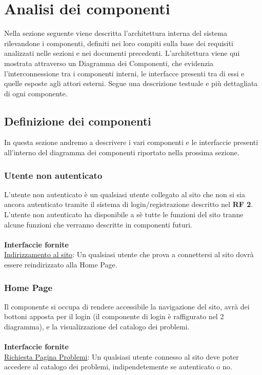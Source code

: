 \documentclass[11pt, a4paper]{article}
\theoremstyle{definition} %
\begin{document}
\newpage
\section{Analisi dei componenti}



Nella sezione seguente viene descritta l'architettura interna del sistema
rilevandone i componenti, definiti nei loro compiti sulla base dei requisiti
analizzati nelle sezioni e nei documenti precedenti. L'architettura viene
qui mostrata attraverso un Diagramma dei Componenti, che evidenzia
l'interconnessione tra i componenti interni, le interfacce presenti tra di
essi e quelle esposte agli attori esterni. Segue una descrizione testuale
e più dettagliata di ogni componente.


\subsection{Definizione dei componenti}
In questa sezione andremo a descrivere i vari componenti e le interfaccie presenti all'interno del diagramma dei componenti riportato nella prossima sezione.
\subsubsection{Utente non autenticato}
L'utente non autenticato è un qualsiasi utente collegato al sito che non si sia ancora autenticato tramite il sistema di login/registrazione descritto nel \textbf{RF 2}.\\
L'utente non autenticato ha disponibile a sè tutte le funzioni del sito tranne alcune funzioni che verranno descritte in componenti futuri.\\
\\
\textbf{Interfaccie fornite}\\
\underline{Indirizzamento al sito}: Un qualsiasi utente che prova a connettersi al sito dovrà essere reindirizzato alla Home Page.
\subsubsection{Home Page}
Il componente si occupa di rendere accessibile la navigazione del sito, avrà dei bottoni apposta per il login (il componente di login è raffigurato nel 2 diagramma), e la visualizzazione del catalogo dei problemi.
\\\\\textbf{Interfaccie fornite}\\
\underline{Richiesta Pagina Problemi}: Un qualsiasi utente connesso al sito deve poter accedere al catalogo dei problemi, indipendetemente se autenticato o no.
\end{document}
